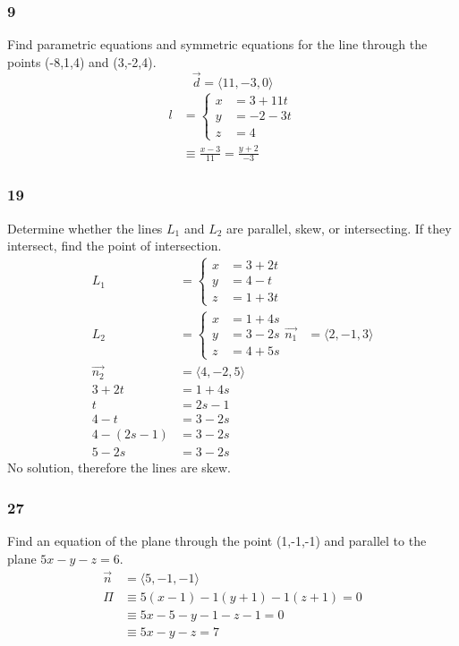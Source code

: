 \documentclass[letterpaper, 12pt]{math}
\begin{document}
\subsubsection*{9}
Find parametric equations and symmetric equations for the line through the
points (-8,1,4) and (3,-2,4).
\[ \vec{d} = \langle11,-3,0\rangle \]
\begin{align*}
  l &= \begin{cases}
    x &= 3+11t \\
    y &= -2-3t \\
    z &= 4
  \end{cases} \\
  &\equiv \frac{x-3}{11} = \frac{y+2}{-3}
\end{align*}

\subsubsection*{19}
Determine whether the lines \( L_1 \) and \( L_2 \) are parallel, skew, or
intersecting. If they intersect, find the point of intersection.
\begin{align*}
  L_1 &= \begin{cases}
    x &= 3+2t \\
    y &= 4-t \\
    z &= 1+3t
  \end{cases} \\
  L_2 &= \begin{cases}
    x &= 1+4s \\
    y &= 3-2s \\
    z &= 4+5s
  \end{cases}
  \vec{n_1} &= \langle2,-1,3\rangle \\
  \vec{n_2} &= \langle4,-2,5\rangle \\
  3+2t &= 1+4s \\
  t &= 2s-1 \\
  4-t &= 3-2s \\
  4-(2s-1) &= 3-2s \\
  5-2s &= 3-2s
\end{align*}
No solution, therefore the lines are skew.

\subsubsection*{27}
Find an equation of the plane through the point (1,-1,-1) and parallel to the
plane \( 5x-y-z = 6 \).
\begin{align*}
  \vec{n} &= \langle5,-1,-1\rangle \\
  \Pi &\equiv 5(x-1)-1(y+1)-1(z+1) = 0 \\
  &\equiv 5x-5-y-1-z-1 = 0 \\
  &\equiv 5x-y-z = 7
\end{align*}
\end{document}
